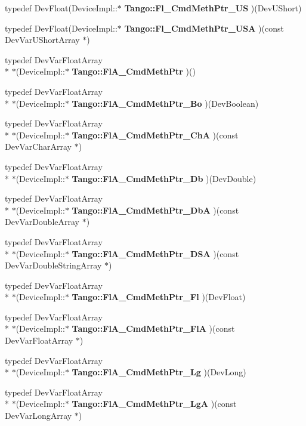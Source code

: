 \begin{DoxyCompactItemize}
typedef Dev\-Float(Device\-Impl\-::$\ast$ {\bf Tango\-::\-Fl\-\_\-\-Cmd\-Meth\-Ptr\-\_\-\-U\-S} )(Dev\-U\-Short)
\item 
typedef Dev\-Float(Device\-Impl\-::$\ast$ {\bf Tango\-::\-Fl\-\_\-\-Cmd\-Meth\-Ptr\-\_\-\-U\-S\-A} )(const Dev\-Var\-U\-Short\-Array $\ast$)
\item 
typedef Dev\-Var\-Float\-Array \\*
$\ast$(Device\-Impl\-::$\ast$ {\bf Tango\-::\-Fl\-A\-\_\-\-Cmd\-Meth\-Ptr} )()
\item 
typedef Dev\-Var\-Float\-Array \\*
$\ast$(Device\-Impl\-::$\ast$ {\bf Tango\-::\-Fl\-A\-\_\-\-Cmd\-Meth\-Ptr\-\_\-\-Bo} )(Dev\-Boolean)
\item 
typedef Dev\-Var\-Float\-Array \\*
$\ast$(Device\-Impl\-::$\ast$ {\bf Tango\-::\-Fl\-A\-\_\-\-Cmd\-Meth\-Ptr\-\_\-\-Ch\-A} )(const Dev\-Var\-Char\-Array $\ast$)
\item 
typedef Dev\-Var\-Float\-Array \\*
$\ast$(Device\-Impl\-::$\ast$ {\bf Tango\-::\-Fl\-A\-\_\-\-Cmd\-Meth\-Ptr\-\_\-\-Db} )(Dev\-Double)
\item 
typedef Dev\-Var\-Float\-Array \\*
$\ast$(Device\-Impl\-::$\ast$ {\bf Tango\-::\-Fl\-A\-\_\-\-Cmd\-Meth\-Ptr\-\_\-\-Db\-A} )(const Dev\-Var\-Double\-Array $\ast$)
\item 
typedef Dev\-Var\-Float\-Array \\*
$\ast$(Device\-Impl\-::$\ast$ {\bf Tango\-::\-Fl\-A\-\_\-\-Cmd\-Meth\-Ptr\-\_\-\-D\-S\-A} )(const Dev\-Var\-Double\-String\-Array $\ast$)
\item 
typedef Dev\-Var\-Float\-Array \\*
$\ast$(Device\-Impl\-::$\ast$ {\bf Tango\-::\-Fl\-A\-\_\-\-Cmd\-Meth\-Ptr\-\_\-\-Fl} )(Dev\-Float)
\item 
typedef Dev\-Var\-Float\-Array \\*
$\ast$(Device\-Impl\-::$\ast$ {\bf Tango\-::\-Fl\-A\-\_\-\-Cmd\-Meth\-Ptr\-\_\-\-Fl\-A} )(const Dev\-Var\-Float\-Array $\ast$)
\item 
typedef Dev\-Var\-Float\-Array \\*
$\ast$(Device\-Impl\-::$\ast$ {\bf Tango\-::\-Fl\-A\-\_\-\-Cmd\-Meth\-Ptr\-\_\-\-Lg} )(Dev\-Long)
\item 
typedef Dev\-Var\-Float\-Array \\*
$\ast$(Device\-Impl\-::$\ast$ {\bf Tango\-::\-Fl\-A\-\_\-\-Cmd\-Meth\-Ptr\-\_\-\-Lg\-A} )(const Dev\-Var\-Long\-Array $\ast$)

\end{DoxyCompactItemize}
